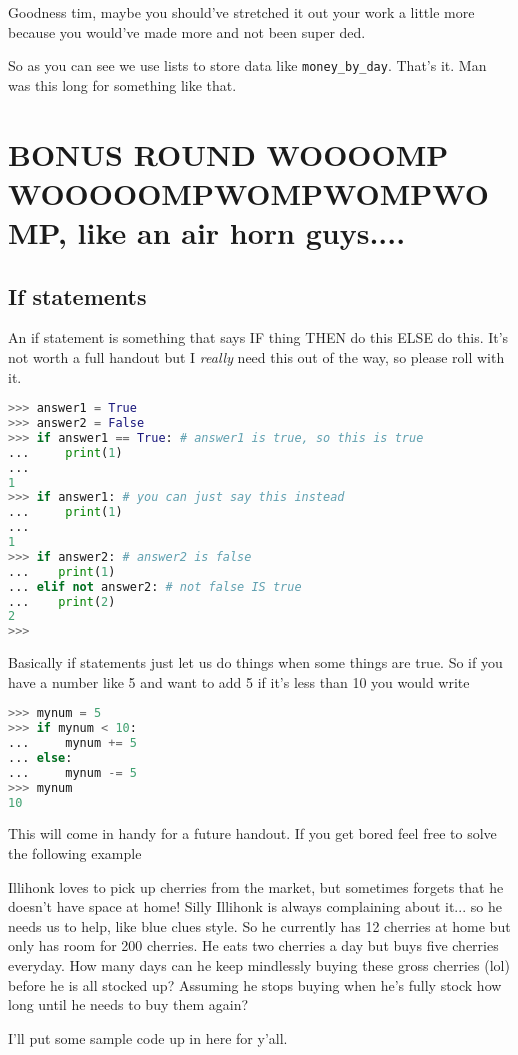 \documentclass{article}
\begin{document}
Goodness tim, maybe you should've stretched it out your work a little more because 
you would've made more and not been super ded. 

So as you can see we use lists to store data like \verb|money_by_day|. 
That's it. 
Man was this long for something like that.

\section{BONUS ROUND WOOOOMP WOOOOOMPWOMPWOMPWOMP, like an air horn guys....}
\subsection{If statements}
An if statement is something that says IF thing THEN do this ELSE do this.
It's not worth a full handout but I \textit{really} need this out of the way, so please 
roll with it. 
\begin{lstlisting}[language=Python]
>>> answer1 = True
>>> answer2 = False
>>> if answer1 == True: # answer1 is true, so this is true
...     print(1)
... 
1
>>> if answer1: # you can just say this instead
...     print(1)
... 
1
>>> if answer2: # answer2 is false
...    print(1)
... elif not answer2: # not false IS true
...    print(2)
2
>>>
\end{lstlisting}
Basically if statements just let us do things when some things are true. 
So if you have a number like 5 and want to add 5 if it's less than 10 you would write
\begin{lstlisting}[language=Python]
>>> mynum = 5
>>> if mynum < 10:
...     mynum += 5
... else:
...     mynum -= 5
>>> mynum
10
\end{lstlisting}
This will come in handy for a future handout.
If you get bored feel free to solve the following example 
\begin{displayquote}
Illihonk loves to pick up cherries from the market, but sometimes forgets that he doesn't have 
space at home!
Silly Illihonk is always complaining about it... so he needs us to help, like blue clues style. 
So he currently has 12 cherries at home but only has room for 200 cherries. 
He eats two cherries a day but buys five cherries everyday.
How many days can he keep mindlessly buying these gross cherries (lol) before he is all 
stocked up?
Assuming he stops buying when he's fully stock how long until he needs to buy them again?
\end{displayquote}
\newpage
I'll put some sample code up in here for y'all.
\end{document}
